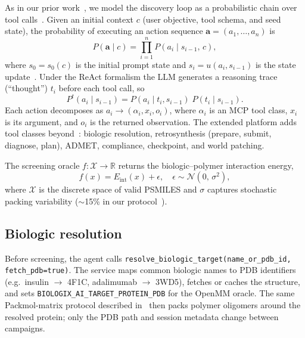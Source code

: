 \documentclass[twocolumn]{fairmeta}
\begin{document}
As in our prior work~\cite{martins2026insulin}, we model the discovery loop as a probabilistic chain over tool calls~\cite{stephens2025mathframing}.
Given an initial context $c$ (user objective, tool schema, and seed state), the probability of executing an action sequence $\mathbf{a} = (a_1, \ldots, a_n)$ is
\begin{equation}
P(\mathbf{a} \mid c) = \prod_{i=1}^{n} P(a_i \mid s_{i-1},\, c),
\label{eq:chain}
\end{equation}
where $s_0 = s_0(c)$ is the initial prompt state and $s_i = u(a_i, s_{i-1})$ is the state update~\cite{puterman1994mdp}.
Under the ReAct formalism the LLM generates a reasoning trace (``thought'') $t_i$ before each tool call, so
\begin{equation}
P^t(a_i \mid s_{i-1}) = P(a_i \mid t_i, s_{i-1})\; P(t_i \mid s_{i-1}).
\label{eq:react}
\end{equation}
Each action decomposes as $a_i \to (\alpha_i, x_i, o_i)$, where $\alpha_i$ is an MCP tool class, $x_i$ is its argument, and $o_i$ is the returned observation.
The extended platform adds tool classes beyond~\cite{martins2026insulin}: biologic resolution, retrosynthesis (prepare, submit, diagnose, plan), ADMET, compliance, checkpoint, and world patching.

The screening oracle $f\!:\!\mathcal{X}\!\to\!\mathbb{R}$ returns the biologic--polymer interaction energy,
\begin{equation}
f(x) = E_\text{int}(x) + \epsilon, \quad \epsilon \sim \mathcal{N}(0,\,\sigma^2),
\label{eq:oracle}
\end{equation}
where $\mathcal{X}$ is the discrete space of valid PSMILES and $\sigma$ captures stochastic packing variability (${\sim}$15\% in our protocol~\cite{martins2026insulin}).

\subsection{Biologic resolution}
\label{sec:biologic}

Before screening, the agent calls \texttt{resolve\_biologic\_target(name\_or\_pdb\_id, fetch\_pdb=true)}.
The service maps common biologic names to PDB identifiers (e.g.\ insulin $\to$ 4F1C, adalimumab $\to$ 3WD5), fetches or caches the structure, and sets \texttt{BIOLOGIX\_AI\_TARGET\_PROTEIN\_PDB} for the OpenMM oracle.
The same Packmol-matrix protocol described in~\cite{martins2026insulin} then packs polymer oligomers around the resolved protein; only the PDB path and session metadata change between campaigns.
\end{document}
